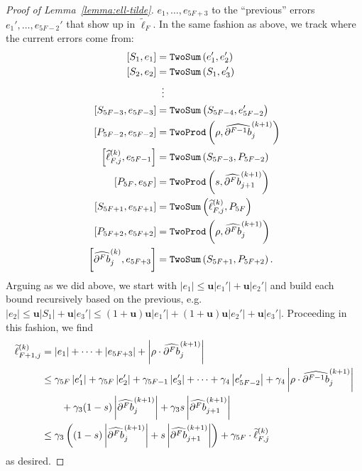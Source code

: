 \documentclass[3p, authoryear, square]{elsarticle}
\theoremstyle{definition}
\newcommand{\mach}{\mathbf{u}}
\newcommand{\cdb}[1]{
  \ifthenelse{\equal{#1}{1}}
             {\widehat{\partial b}}
             {\widehat{\partial^{#1} b}}
}
\begin{document}
\begin{proof}[Proof of Lemma~\ref{lemma:ell-tilde}]
\(e_1, \ldots, e_{5F + 3}\) to the ``previous'' errors \(e_1',
\ldots, e_{5F - 2}'\) that show up in \(\widetilde{\ell}_F\). In the same
fashion as above, we track where the current errors come from:
\begin{align}
\left[S_1, e_1\right] &= \mathtt{TwoSum}\left(e_1', e_2'\right) \\
\left[S_2, e_2\right] &= \mathtt{TwoSum}\left(S_1, e_3'\right) \\
&\mathrel{\makebox[\widthof{=}]{\vdots}} \nonumber \\
\left[S_{5F - 3}, e_{5F - 3}\right] &=
  \mathtt{TwoSum}\left(S_{5F - 4}, e_{5F - 2}'\right) \\
\left[P_{5F - 2}, e_{5F - 2}\right] &= \mathtt{TwoProd}\left(\rho,
  \cdb{F - 1}_j^{(k + 1)}\right) \\
\left[\widehat{\ell}_{F, j}^{(k)}, e_{5F - 1}\right] &=
  \mathtt{TwoSum}\left(S_{5F - 3}, P_{5F - 2}\right) \\
\left[P_{5F}, e_{5F}\right] &= \mathtt{TwoProd}\left(s,
  \cdb{F}_{j + 1}^{(k + 1)}\right) \\
\left[S_{5F + 1}, e_{5F + 1}\right] &=
  \mathtt{TwoSum}\left(\widehat{\ell}_{F, j}^{(k)}, P_{5F}\right) \\
\left[P_{5F + 2}, e_{5F + 2}\right] &= \mathtt{TwoProd}\left(\rho,
  \cdb{F}_j^{(k + 1)}\right) \\
\left[\cdb{F}_j^{(k)}, e_{5F + 3}\right] &= \mathtt{TwoSum}\left(
  S_{5F + 1}, P_{5F + 2}\right).
\end{align}
Arguing as we did above, we start with
\(\left|e_1\right| \leq \mach \left|e_1'\right| + \mach \left|e_2'\right|\)
and build each bound recursively based on the previous, e.g.
\(\left|e_2\right| \leq \mach \left|S_1\right| + \mach \left|e_3'\right| \leq
(1 + \mach) \mach \left|e_1'\right| + (1 + \mach) \mach \left|e_2'\right| +
\mach \left|e_3'\right|\). Proceeding in this fashion, we find
\begin{align}
\widetilde{\ell}_{F + 1, j}^{(k)} &= \left|e_1\right| + \cdots +
  \left|e_{5F + 3}\right| + \left|\rho \cdot \cdb{F}_j^{(k + 1)}\right| \\
&\leq \gamma_{5F} \left|e_1'\right| + \gamma_{5F} \left|e_2'\right| +
  \gamma_{5F - 1} \left|e_3'\right| + \cdots +
  \gamma_4 \left|e_{5F - 2}'\right| +
  \gamma_4 \left|\rho \cdot \cdb{F - 1}_j^{(k + 1)}\right| \\
&\qquad + \gamma_3 (1 - s) \left|
  \cdb{F}_j^{(k + 1)}\right| + \gamma_3 s \left|
  \cdb{F}_{j + 1}^{(k + 1)}\right| \\
&\leq \gamma_3 \left(
  (1 - s) \left|\cdb{F}_j^{(k + 1)}\right| +
  s \left|\cdb{F}_{j + 1}^{(k + 1)}\right|\right) +
  \gamma_{5F} \cdot \widetilde{\ell}_{F, j}^{(k)}
\end{align}
as desired.
\end{proof}
\end{document}
